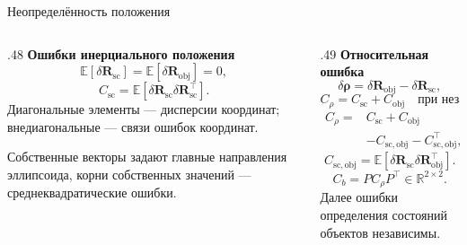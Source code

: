 \documentclass[11pt,aspectratio=169,t]{beamer}
\newcommand{\eqcompact}{\fontsize{10}{12}\selectfont}
\newcommand{\derivationmathspacing}{%
  \setlength{\abovedisplayskip}{2pt}%
  \setlength{\belowdisplayskip}{3pt}%
  \setlength{\abovedisplayshortskip}{2pt}%
  \setlength{\belowdisplayshortskip}{2pt}%
  \setlength{\jot}{2pt}}
\newcommand{\vect}[1]{\boldsymbol{#1}}
\begin{document}
\begin{frame}{Неопределённость положения}
\relax\derivationmathspacing
\begin{columns}[T,onlytextwidth]
\begin{column}{.48\textwidth}
\textbf{Ошибки инерциального положения}
{\eqcompact\derivationmathspacing
\[
\mathbb{E}[\delta\vect R_{\mathrm{sc}}]=
\mathbb{E}[\delta\vect R_{\mathrm{obj}}]=0,
\]
\[
C_{\mathrm{sc}}=\mathbb{E}
 [\delta\vect R_{\mathrm{sc}}\delta\vect R_{\mathrm{sc}}^\top].
\]
}
Диагональные элементы --- дисперсии координат;
внедиагональные --- связи ошибок координат.
\par\smallskip
Собственные векторы задают главные направления эллипсоида,
корни собственных значений --- среднеквадратические ошибки.
\end{column}
\begin{column}{.49\textwidth}
\textbf{Относительная ошибка}
{\eqcompact\derivationmathspacing
\[
\delta\vect\rho=
\delta\vect R_{\mathrm{obj}}-\delta\vect R_{\mathrm{sc}},
\]
\[
\boxed{C_\rho=C_{\mathrm{sc}}+C_{\mathrm{obj}}}
\quad\text{при независимости},
\]
\[
\begin{aligned}
C_\rho={}&C_{\mathrm{sc}}+C_{\mathrm{obj}}\\
&-C_{\mathrm{sc},\mathrm{obj}}-C_{\mathrm{sc},\mathrm{obj}}^\top,
\end{aligned}
\]
\[
C_{\mathrm{sc},\mathrm{obj}}=
\mathbb{E}[\delta\vect R_{\mathrm{sc}}\delta\vect R_{\mathrm{obj}}^\top].
\]
\[
\boxed{C_b=PC_\rho P^\top\in\mathbb R^{2\times2}.}
\]
}
Далее ошибки определения состояний объектов независимы.
\end{column}
\end{columns}
\end{frame}
\end{document}
